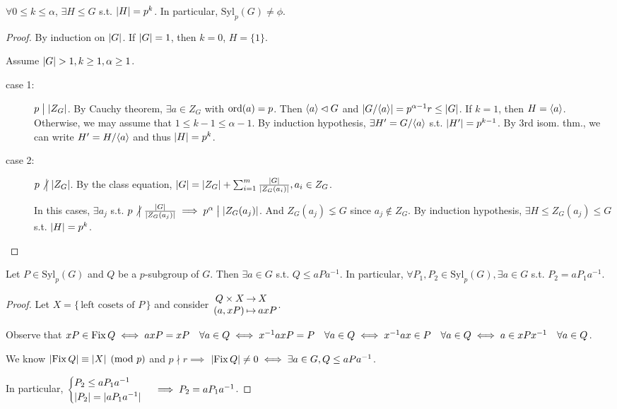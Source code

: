 \begin{theorem}
  $\forall 0 \le k \le \alpha$, $\exists H \le G$ s.t. $\abs{H} = p^k$.
  In particular, $\text{Syl}_p(G) \ne \phi$.

  \begin{proof}
    By induction on $\abs{G}$. If $\abs{G} = 1$, then $k = 0$, $H = \{1\}$.

    Assume $\abs{G} > 1, k \ge 1, \alpha \ge 1$.

    \begin{description}
      \item[case 1:] $p \Div \abs{Z_G}$. By Cauchy theorem,
        $\exists a \in Z_G$ with $\ord(a) = p$.
        Then $\gen{a} \lhd G$ and $\abs*{\quot{G}{\gen{a}}} = p^{\alpha-1} r
        \le \abs{G}$.
        If $k=1$, then $H = \gen{a}$.
        Otherwise, we may assume that $1\le k-1\le \alpha-1$. By induction
        hypothesis, $\exists H' = \quot{G}{\gen{a}}$ s.t. $\abs{H'} = p^{k-1}$.
        By 3rd isom. thm., we can write $H' = \quot{H}{\gen{a}}$ and thus
        $\abs{H} = p^k$.
      \item[case 2:] $p \nDiv \abs{Z_G}$. By the class equation,
        $\abs{G} = \abs{Z_G} + \sum_{i=1}^m \frac{\abs{G}}{\abs{Z_G(a_i)}},
        a_i \in Z_G$.

        In this cases, $\exists a_j$ s.t.
        $p \nDiv \frac{\abs{G}}{\abs{Z_G(a_j)}} \implies
        p^\alpha \Div \abs{Z_G(a_j)}$. And $Z_G(a_j) \lneq G$ since
        $a_j \not\in Z_G$.
        By induction hypothesis, $\exists H \le Z_G(a_j) \le G$ s.t.
        $\abs{H} = p^k$. \qedhere
    \end{description}
  \end{proof}
\end{theorem}

\begin{theorem}
  Let $P \in \text{Syl}_p(G)$ and $Q$ be a $p$-subgroup of $G$. Then
  $\exists a \in G$ s.t. $Q \le aPa^{-1}$.
  In particular, $\forall P_1, P_2 \in \text{Syl}_p(G), \exists a \in G$
  s.t. $P_2 = aP_1a^{-1}$.
  \begin{proof}
    Let $X = \{\, \text{left cosets of $P$} \,\}$ and consider
    $\arraycolsep=1pt \begin{array}{rcl}
      Q \times X & \to & X \\
      (a, xP) & \mapsto & axP
    \end{array}$.

    Observe that $xP \in \Fix Q \iff axP = xP \quad \forall a \in Q \iff
    x^{-1}axP = P \quad \forall a \in Q \iff
    x^{-1}ax \in P \quad \forall a \in Q \iff
    a \in xPx^{-1} \quad \forall a \in Q$.

    We know $\abs{\Fix Q} \equiv \abs{X} \pmod p$ and $p \nmid r \implies$
    $\abs{\Fix Q} \ne 0 \iff \exists a \in G, Q \le aPa^{-1}$.

    In particular, $\begin{cases}
      P_2 \le aP_1a^{-1} \\
      \abs{P_2} = \abs{aP_1a^{-1}}
    \end{cases} \implies P_2 = aP_1a^{-1}$.
  \end{proof}
\end{theorem}

